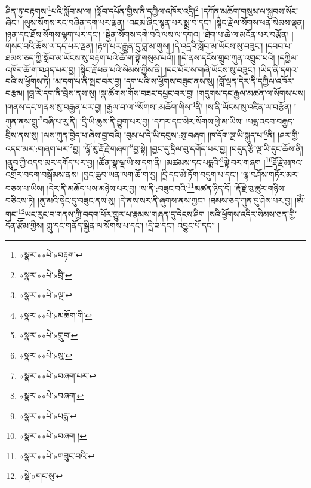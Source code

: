 ཤིན་ཏུ་བརྟགས་\footnote{«སྣར་»«པེ་»བརྟག་}པའི་སློབ་མ་ལ། །སློབ་དཔོན་གྱིས་ནི་དཀྱིལ་འཁོར་འདྲི།\footnote{«སྣར་»«པེ་»བྲི།} །དཀོན་མཆོག་གསུམ་ལ་སྐྱབས་སོང་ཞིང་། །ལུས་སོགས་རང་བཞིན་དག་པར་ལྡན། །འཇམ་ཞིང་སྙན་པར་སྨྲ་བ་དང་། །སྙིང་རྗེ་ལ་སོགས་ཕན་སེམས་ལྡན། །ཉན་དང་ཐོས་སོགས་ལྷག་པར་དང་། །སྦྱིན་སོགས་དགེ་བའི་ལས་ལ་དགའ། །ཐེག་པ་ཆེ་ལ་མངོན་པར་བརྩོན། །གསང་བའི་ཆོས་ལ་དད་པར་ལྡན། །རྟག་པར་རྒྱུན་དུ་བླ་མ་གུས། །དེ་འདྲའི་སློབ་མ་ཡོངས་སུ་བཟུང་། །དབབ་པ་ཐམས་ཅད་ཀྱི་སློབ་མ་ཡོངས་སུ་བརྟག་པའི་ཆོ་ག་སྟེ་གསུམ་པའོ།། །།དེ་ནས་དངོས་གྲུབ་ཀུན་འགྲུབ་པའི། །དཀྱིལ་འཁོར་ཆོ་ག་བཤད་པར་བྱ། །སྙིང་རྗེ་ཕན་པའི་སེམས་ཀྱིས་ནི། །དང་པོར་ས་གཞི་ཡོངས་སུ་བཟུང་། །ཡིད་ནི་དགའ་བའི་ས་ཕྱོགས་ཏེ། །མ་དག་པ་ནི་སྤང་བར་བྱ། །དག་པའི་ས་ཕྱོགས་བཟུང་ནས་སུ། །བློ་ལྡན་དེར་ནི་དཀྱིལ་འཁོར་བརྩམ། །བླ་རེ་དག་ནི་བྲེས་ནས་སུ། །སྣ་ཚོགས་གོས་བཟང་དཔྱང་བར་བྱ། །གདུགས་དང་རྒྱལ་མཚན་ལ་སོགས་པས། །གནས་དང་གནས་སུ་བརྒྱན་པར་བྱ། །རྒྱལ་བ་ལ་\footnote{«སྣར་»«པེ་»ལྔ་}སོགས་:མཆོག་གིས་\footnote{«སྣར་»«པེ་»མཆོག་གི་}ནི། །ས་ནི་ཡོངས་སུ་འཛིན་ལ་བརྩོན། །ཀུན་ནས་གྲུ་\footnote{«སྣར་»«པེ་»གྲུབ་}བཞི་པ་རུ་ནི། །དྲི་ཡི་ཆུས་ནི་བྱུག་པར་བྱ། །དཀར་དང་སེར་སོགས་ཕྱེ་མ་ཡིས། །པདྨ་འདབ་བརྒྱད་བྲིས་ནས་སུ། །ལས་ཀུན་བྱེད་པ་ཞེས་བྱ་བའི། །བུམ་པ་དེ་ཡི་དབུས་:སུ་བཞག །ཁ་དོག་ལྔ་ཡི་སྐུད་པ་\footnote{«སྣར་»«པེ་»སུ་}ནི། །ཤར་གྱི་འདབ་མར་:གཞག་པར་\footnote{«སྣར་»«པེ་»བཞག་པར་}བྱ། །ལྷོ་རུ་རྡོ་རྗེ་གཞག་\footnote{«སྣར་»«པེ་»བཞག་}བྱ་སྟེ། །བྱང་དུ་དྲིལ་བུ་དགོད་པར་བྱ། །བདུད་རྩི་ལྔ་ཡི་དུང་ཆོས་ནི། །ནུབ་ཀྱི་འདབ་མར་དགོད་པར་བྱ། །ཚོན་སྣ་ལྔ་ཡི་ས་དག་ནི། །མཚམས་དང་པདྨའི་\footnote{«སྣར་»«པེ་»པདྨ་}ལྟེ་བར་གཞག །\footnote{«སྣར་»«པེ་»བཞག །}རྡོ་རྗེ་མཁའ་འགྲོར་བདག་བསྒོམས་ནས། །བྱང་ཆུབ་ཡན་ལག་ཆོ་ག་བྱ། །དྲི་དང་མེ་ཏོག་བདུག་པ་དང་། །ལྷ་བཤོས་གཏོར་མར་བཅས་པ་ཡིས། །དེར་ནི་མཆོད་པས་མཉེས་པར་བྱ། །ས་ནི་:བཟུང་བའི་\footnote{«སྣར་»«པེ་»གཟུང་བའི་}མཚན་ཉིད་དོ། །རྡོ་རྗེ་ཁུ་ཚུར་གཉིས་བཅིངས་ཏེ། །ནུ་མའི་སྟེང་དུ་བཟུང་ནས་སུ། །དེ་ནས་སར་ནི་ཞུགས་ནས་ཀྱང་། །ཐམས་ཅད་ཀུན་དུ་ཤེས་པར་བྱ། །ཨོཾ་གང་\footnote{«སྡེ་»གང་སུ་}ཡང་རུང་བ་གནས་ཀྱི་བདག་པོར་གྱུར་པ་རྣམས་གཞན་དུ་དེངས་ཤིག །སའི་ཕྱོགས་འདིར་སེམས་ཅན་གྱི་དོན་རྩོམ་གྱིས། ཀླུ་དང་གནོད་སྦྱིན་ལ་སོགས་པ་དང་། །དྲི་ཟ་དང་། འབྱུང་པོ་དང་། །
